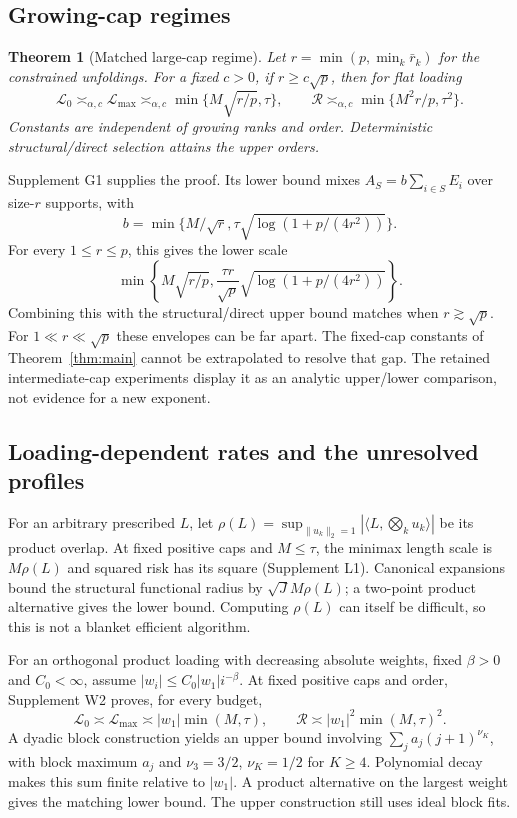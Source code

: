 \documentclass[11pt]{article}
\newtheorem{theorem}{Theorem}
\newcommand{\ip}[2]{\langle #1,#2\rangle}
\newcommand{\norm}[1]{\lVert #1\rVert}
\newcommand{\calL}{\mathcal L}
\begin{document}
\subsection{Growing-cap regimes}
\begin{theorem}[Matched large-cap regime]\label{thm:growing}
Let $r=\min(p,\min_k\bar r_k)$ for the constrained unfoldings. For a fixed $c>0$, if $r\ge c\sqrt p$, then for flat loading
\[
 \calL_0\asymp_{\alpha,c}\calL_{\max}\asymp_{\alpha,c}
 \min\{M\sqrt{r/p},\tau\},
 \qquad\mathcal R\asymp_{\alpha,c}\min\{M^2r/p,\tau^2\}.
\]
Constants are independent of growing ranks and order. Deterministic structural/direct selection attains the upper orders.
\end{theorem}
Supplement G1 supplies the proof. Its lower bound mixes $A_S=b\sum_{i\in S}E_i$ over size-$r$ supports, with
\[
 b=\min\{M/\sqrt r,\tau\sqrt{\log(1+p/(4r^2))}\}.
\]
For every $1\le r\le p$, this gives the lower scale
\begin{equation}\label{eq:intermediate}
 \min\left\{M\sqrt{r/p},\frac{\tau r}{\sqrt p}\sqrt{\log(1+p/(4r^2))}\right\}.
\end{equation}
Combining this with the structural/direct upper bound matches when $r\gtrsim\sqrt p$. For $1\ll r\ll\sqrt p$ these envelopes can be far apart. The fixed-cap constants of Theorem~\ref{thm:main} cannot be extrapolated to resolve that gap. The retained intermediate-cap experiments display it as an analytic upper/lower comparison, not evidence for a new exponent.

\subsection{Loading-dependent rates and the unresolved profiles}
For an arbitrary prescribed $L$, let
$\rho(L)=\sup_{\norm{u_k}_2=1}|\ip L{\bigotimes_ku_k}|$ be its product overlap. At fixed positive caps and $M\le\tau$, the minimax length scale is $M\rho(L)$ and squared risk has its square (Supplement L1). Canonical expansions bound the structural functional radius by $\sqrt J M\rho(L)$; a two-point product alternative gives the lower bound. Computing $\rho(L)$ can itself be difficult, so this is not a blanket efficient algorithm.

For an orthogonal product loading with decreasing absolute weights, fixed $\beta>0$ and $C_0<\infty$, assume $|w_i|\le C_0|w_1|i^{-\beta}$. At fixed positive caps and order, Supplement W2 proves, for every budget,
\[
 \calL_0\asymp\calL_{\max}\asymp |w_1|\min(M,\tau),\qquad
 \mathcal R\asymp |w_1|^2\min(M,\tau)^2.
\]
A dyadic block construction yields an upper bound involving
$\sum_j a_j(j+1)^{\nu_K}$, with block maximum $a_j$ and $\nu_3=3/2$, $\nu_K=1/2$ for $K\ge4$. Polynomial decay makes this sum finite relative to $|w_1|$. A product alternative on the largest weight gives the matching lower bound. The upper construction still uses ideal block fits.
\end{document}
